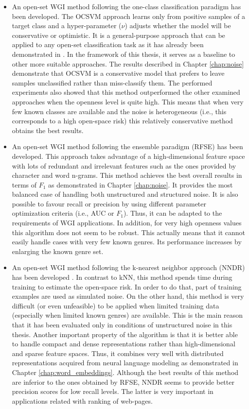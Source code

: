 \begin{itemize}
    \item An open-set WGI method following the one-class classification paradigm has been developed. The OCSVM approach learns only from positive samples of a target class and a hyper-parameter ($\nu$) adjusts whether the model will be conservative or optimistic. It is a general-purpose approach that can be applied to any open-set classification task as it has already been demonstrated in \parencite{mendesjunior2016}. In the framework of this thesis, it serves as a baseline to other more suitable approaches. The results described in Chapter \ref{chap:noise} demonstrate that OCSVM is a conservative model that prefers to leave samples unclassified rather than miss-classify them. The performed experiments also showed that this method outperformed the other examined approaches when the openness level is quite high. This means that when very few known classes are available and the noise is heterogeneous (i.e., this corresponds to a high open-space risk) this relatively conservative method obtains the best results.
    \item An open-set WGI method following the ensemble paradigm (RFSE) has been developed. This approach takes advantage of a high-dimensional feature space with lots of redundant and irrelevant features such as the ones provided by character and word n-grams. This method achieves the best overall results in terms of $F_1$ as demonstrated in Chapter \ref{chap:noise}. It provides the most balanced case of handling both unstructured and structured noise. It is also possible to favour recall or precision by using different parameter optimization criteria (i.e., AUC or $F_1$). Thus, it can be adapted to the requirements of WGI applications. In addition, for very high openness values this algorithm does not seem to be robust. This actually means that it cannot easily handle cases with very few known genres. Its performance increases by enlarging the known genre set. 
    \item An open-set WGI method following the k-nearest neighbor approach (NNDR) has been developed \parencite{mendesjunior2016}. In contrast to kNN, this method spends time during training to estimate the open-space risk. In order to do that, part of training examples are used as simulated noise. On the other hand, this method is very difficult (or even unfeasible) to be applied when limited training data (especially when limited known genres) are available. This is the main reason that it has been evaluated only in conditions of unstructured noise in this thesis. Another important property of the algorithm is that it is better able to handle compact and dense representations rather than high-dimensional and sparse feature spaces. Thus, it combines very well with distributed representations acquired from neural language modeling as demonstrated in Chapter \ref{chap:word_embeddings}. Although the best results of this method are inferior to the ones obtained by RFSE, NNDR seems to provide better precision scores for low recall levels. The latter is very important in applications related with ranking of web-pages.

\end{itemize}
